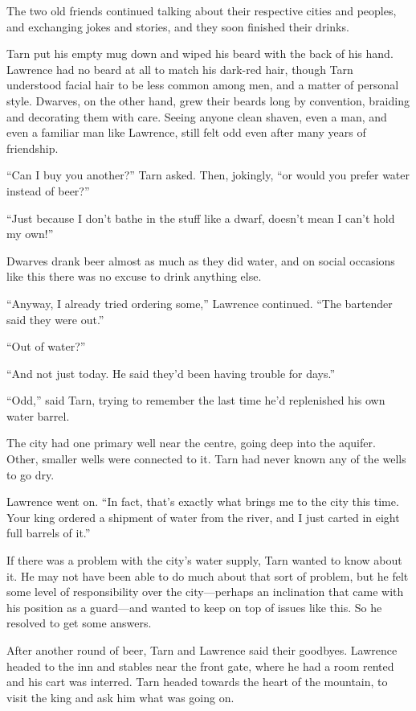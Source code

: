 The two old friends continued talking about their respective cities and peoples, and exchanging jokes and stories, and they soon finished their drinks.

Tarn put his empty mug down and wiped his beard with the back of his hand.  Lawrence had no beard at all to match his dark-red hair, though Tarn understood facial hair to be less common among men, and a matter of personal style.  Dwarves, on the other hand, grew their beards long by convention, braiding and decorating them with care.  Seeing anyone clean shaven, even a man, and even a familiar man like Lawrence, still felt odd even after many years of friendship.

``Can I buy you another?'' Tarn asked.  Then, jokingly, ``or would you prefer water instead of beer?''

``Just because I don't bathe in the stuff like a dwarf, doesn't mean I can't hold my own!''

Dwarves drank beer almost as much as they did water, and on social occasions like this there was no excuse to drink anything else.

``Anyway, I already tried ordering some,'' Lawrence continued.  ``The bartender said they were out.''

``Out of water?''

``And not just today.  He said they'd been having trouble for days.''

``Odd,'' said Tarn, trying to remember the last time he'd replenished his own water barrel.

The city had one primary well near the centre, going deep into the aquifer.  Other, smaller wells were connected to it.  Tarn had never known any of the wells to go dry.

Lawrence went on.  ``In fact, that's exactly what brings me to the city this time.  Your king ordered a shipment of water from the river, and I just carted in eight full barrels of it.''

If there was a problem with the city's water supply, Tarn wanted to know about it.  He may not have been able to do much about that sort of problem, but he felt some level of responsibility over the city---perhaps an inclination that came with his position as a guard---and wanted to keep on top of issues like this.  So he resolved to get some answers.

After another round of beer, Tarn and Lawrence said their goodbyes. Lawrence headed to the inn and stables near the front gate, where he had a room rented and his cart was interred.  Tarn headed towards the heart of the mountain, to visit the king and ask him what was going on.

